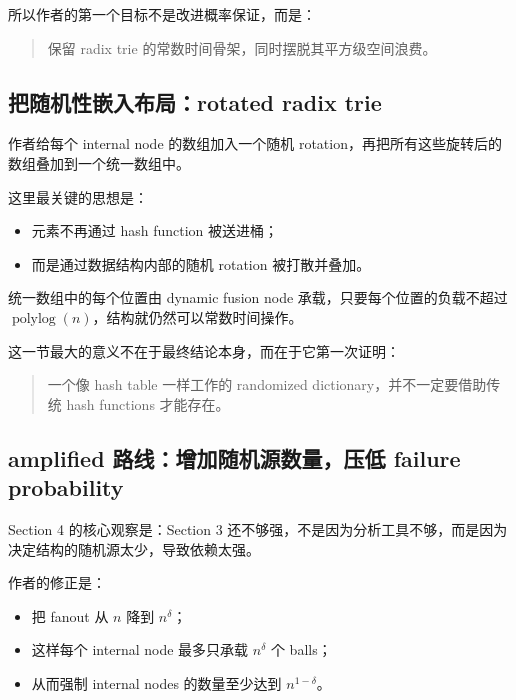 \documentclass[12pt]{article}
\begin{document}
所以作者的第一个目标不是改进概率保证，而是：

\begin{quote}保留 radix trie 的常数时间骨架，同时摆脱其平方级空间浪费。\end{quote}

\subsection{把随机性嵌入布局：rotated radix trie}

作者给每个 internal node 的数组加入一个随机 rotation，再把所有这些旋转后的数组叠加到一个统一数组中。

这里最关键的思想是：

\begin{itemize}

\item 元素不再通过 hash function 被送进桶；

\item 而是通过数据结构内部的随机 rotation 被打散并叠加。

\end{itemize}

统一数组中的每个位置由 dynamic fusion node 承载，只要每个位置的负载不超过 \(\operatorname{polylog}(n)\)，结构就仍然可以常数时间操作\cite[Proposition~1]{kuszmaul2022}。

这一节最大的意义不在于最终结论本身，而在于它第一次证明：

\begin{quote}一个像 hash table 一样工作的 randomized dictionary，并不一定要借助传统 hash functions 才能存在。\end{quote}

\subsection{amplified 路线：增加随机源数量，压低 failure probability}

Section 4 的核心观察是：Section 3 还不够强，不是因为分析工具不够，而是因为决定结构的随机源太少，导致依赖太强。

作者的修正是：

\begin{itemize}

\item 把 fanout 从 \(n\) 降到 \(n^\delta\)；

\item 这样每个 internal node 最多只承载 \(n^\delta\) 个 balls；

\item 从而强制 internal nodes 的数量至少达到 \(n^{1-\delta}\)。

\end{itemize}
\end{document}
